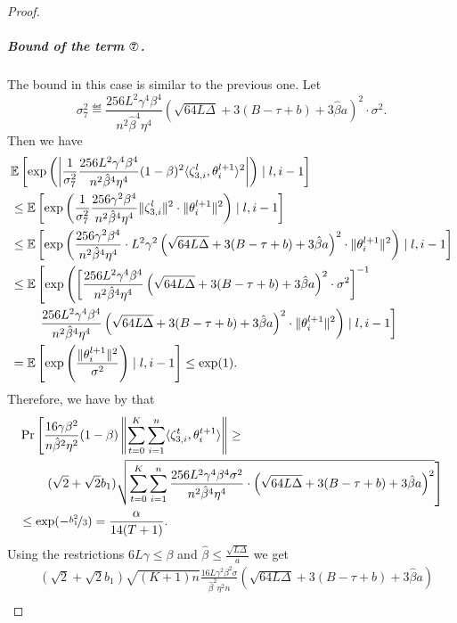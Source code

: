 \documentclass[a4paper,11pt]{article}
\begin{document}
\begin{proof}
     \subparagraph{Bound of the term $\circledSeven$.} The bound in this case is similar to the previous one. Let
     \[
        \sigma_7^2 \eqdef \frac{256L^2\gamma^4\beta^{4}}{n^2\hat{\beta}^4\eta^4} \left(\sqrt{64L\Delta} +3(B-\tau+b)+3\hat{\beta}a\right)^2\cdot \sigma^2.
     \]
     Then we have 
    \begin{align*}
    &\E{\exp\left(\left|\frac{1}{\sigma_7^2}\frac{256L^2\gamma^4\beta^4}{n^2\hat{\beta}^4\eta^4}(1-\beta)^2\<\zeta^l_{3,i},\theta^{l+1}_i>^2\right|\right) \mid l,i-1}\\
    &\le 
    \E{\exp\left(\frac{1}{\sigma_7^2}\frac{256\gamma^2\beta^4}{n^2\hat{\beta}^4\eta^4}\|\zeta_{3,i}^l\|^2 \cdot \|\theta^{l+1}_i\|^2\right)\mid l,i-1}\\
    &\le \E{\exp\left(\frac{256\gamma^2\beta^4}{n^2\hat{\beta}^4\eta^4}\cdot L^2\gamma^2\left(\sqrt{64L\Delta} +3(B-\tau+b)+3\hat{\beta}a\right)^2\cdot \|\theta^{l+1}_i\|^2\right)\mid l,i-1}\\
    &\le \mathbb{E}\left[\exp\left(\left[\frac{256L^2\gamma^4\beta^{4}}{n^2\hat{\beta}^4\eta^4}\left(\sqrt{64L\Delta} +3(B-\tau+b)+3\hat{\beta}a\right)^2\cdot \sigma^2\right]^{-1} \right.\right. \\
    & \qquad \left.\left.\frac{256L^2\gamma^4\beta^{4}}{n^2\hat{\beta}^4\eta^4}\left(\sqrt{64L\Delta} +3(B-\tau+b)+3\hat{\beta}a\right)^2\cdot \|\theta^{l+1}_i\|^2 \right) \mid l,i-1\right]\\
    &= \E{\exp\left(\frac{\|\theta^{l+1}_i\|^2}{\sigma^2}\right) \mid l,i-1} \le \exp(1).
    \end{align*}
    Therefore, we have by  that 
    \begin{align*}
    &\Pr\left[\frac{16\gamma\beta^2}{n\hat{\beta}^2\eta^2}(1-\beta)\left\|\sum_{t=0}^K\sum_{i=1}^n\<\zeta_{3,i}^t,\theta^{t+1}_i>\right\| \ge\right.\\ 
    &\qquad \left.(\sqrt{2}+\sqrt{2}b_1)\sqrt{\sum_{t=0}^K\sum_{i=1}^n \frac{256L^2\gamma^4\beta^{4}\sigma^2}{n^2\hat{\beta}^4\eta^4}\cdot \left(\sqrt{64L\Delta} + 3(B-\tau + b) + 3\hat{\beta}a\right)^2}\right]\\ 
    &\le \exp(-\nicefrac{b_1^2}{3}) = \frac{\alpha}{14(T+1)}.
    \end{align*}
    Using the restrictions $6L\gamma\le\beta$ and $\hat{\beta} \le \frac{\sqrt{L\Delta}}{a}$ we get
    \begin{align*}
    &(\sqrt{2}+\sqrt{2}b_1)\sqrt{(K+1)n}\frac{16L\gamma^2\beta^2\sigma}{\hat{\beta}^2\eta^2n}\left(\sqrt{64L\Delta} + 3(B-\tau + b)+3\hat{\beta}a\right)\\

\end{align*}
\end{proof}
\end{document}
